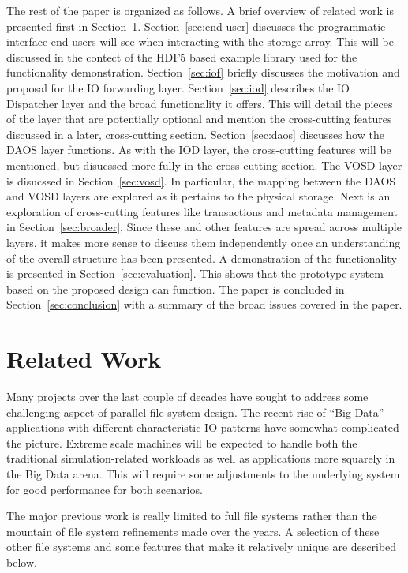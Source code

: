 \documentclass[conference]{IEEEtran}
\begin{document}
The rest of the paper is organized as follows. A brief overview of related work
is presented first in Section~\ref{sec:related}. Section~\ref{sec:end-user}
discusses the programmatic interface end users will see when interacting with
the storage array. This will be discussed in the contect of the HDF5 based
example library used for the functionality demonstration. Section~\ref{sec:iof}
briefly discusses the motivation and proposal for the IO forwarding layer.
Section~\ref{sec:iod} describes the IO Dispatcher layer and the broad
functionality it offers. This will detail the pieces of the layer that are
potentially optional and mention the cross-cutting features discussed in a
later, cross-cutting section. Section~\ref{sec:daos} discusses how the DAOS
layer functions. As with the IOD layer, the cross-cutting features will be
mentioned, but disucssed more fully in the cross-cutting section. The VOSD
layer is disucssed in Section~\ref{sec:vosd}. In particular, the mapping
between the DAOS and VOSD layers are explored as it pertains to the physical
storage. Next is an exploration of cross-cutting features like transactions and
metadata management in Section~\ref{sec:broader}. Since these and other
features are spread across multiple layers, it makes more sense to discuss them
independently once an understanding of the overall structure has been
presented.  A demonstration of the functionality is presented in
Section~\ref{sec:evaluation}. This shows that the prototype system based on the
proposed design can function. The paper is concluded in
Section~\ref{sec:conclusion} with a summary of the broad issues covered in the
paper.

\section{Related Work}
\label{sec:related}

Many projects over the last couple of decades have sought to address some
challenging aspect of parallel file system design. The recent rise of ``Big
Data'' applications with different characteristic IO patterns have somewhat
complicated the picture. Extreme scale machines will be expected to handle both
the traditional simulation-related workloads as well as applications more
squarely in the Big Data arena. This will require some adjustments to the
underlying system for good performance for both scenarios.

The major previous work is really limited to full file systems rather than the
mountain of file system refinements made over the years. A selection of these
other file systems and some features that make it relatively unique are
described below.
\end{document}
